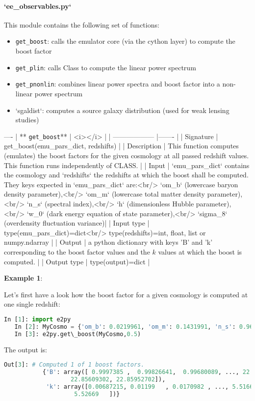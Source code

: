 \documentclass[american,11pt]{article}
\def\code#1{\texttt{#1}}
\begin{document}
\paragraph{`ee\_observables.py`}
This module contains the following set of functions:

\begin{itemize}
\item  \code{get\_boost}: calls the emulator core (via the cython layer) to compute the boost factor
\item  \code{get\_plin}: calls Class to compute the linear power spectrum
\item  \code{get\_pnonlin}: combines linear power spectra and boost factor into a non-linear power spectrum
\item `sgaldist`: computes a source galaxy distribution (used for weak lensing studies)
\end{itemize}
----
| ** \code{get\_boost}** | <i></i> |
| ------------------ |-------  |
| Signature | get\_boost(emu\_pars\_dict, redshifts) |
| Description | This function computes (emulates) the boost factors for the given cosmology at all passed redshift values. This function runs independently of CLASS. |
| Input | `emu\_pars\_dict` contains the cosmology and `redshifts` the redshifts at which the boost shall be computed. They keys expected in `emu\_pars\_dict` are:<br/> `om\_b` (lowercase baryon density parameter),<br/> `om\_m` (lowercase total matter density parameter),<br/> `n\_s` (spectral index),<br/> `h` (dimensionless Hubble parameter),<br/> `w\_0` (dark energy equation of state parameter),<br/> `sigma\_8` (overdensity fluctuation variance)|
| Input type | type(emu\_pars\_dict)=dict<br/> type(redshifts)=int, float, list or numpy.ndarray |
| Output | a python dictionary with keys 'B' and 'k' corresponding to the boost factor values and the $k$ values at which the boost is computed. |
| Output type | type(output)=dict |

\textbf{Example 1}:

Let's first have a look how the boost factor for a given cosmology is computed at one single redshift:
\begin{lstlisting}[language=python]
   In [1]: import e2py
   In [2]: MyCosmo = {'om_b': 0.0219961, 'om_m': 0.1431991, 'n_s': 0.96, 'h': 0.67, 'w_0': -1.0, 'sigma_8': 0.83}
   In [3]: e2py.get\_boost(MyCosmo,0.5)
\end{lstlisting}
The output is:
\begin{lstlisting}[language=python]
   Out[3]: # Computed 1 of 1 boost factors.
           {'B': array([ 0.9997385 ,  0.99826641,  0.99680089, ..., 22.8561094 ,
                   22.85609302, 22.85952702]),
            'k': array([0.00687215, 0.01199   , 0.0170982 , ..., 5.51663   , 5.52166   ,
                    5.52669   ])}
\end{lstlisting}
\end{document}
